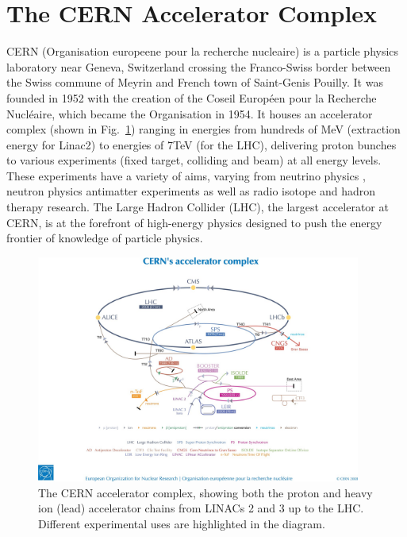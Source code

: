 \section{The CERN Accelerator Complex}

CERN (Organisation europeene pour la recherche nucleaire) is a particle physics laboratory near Geneva, Switzerland crossing the Franco-Swiss border between the Swiss commune of Meyrin and French town of Saint-Genis Pouilly. It was founded in 1952 with the creation of the Coseil Europ\'{e}en pour la Recherche Nucl\'{e}aire, which became the Organisation in 1954. It houses an accelerator complex (shown in Fig.~\ref{fig:CERN-acc-complex}) ranging in energies from hundreds of MeV (extraction energy for Linac2) to energies of 7TeV (for the LHC), delivering proton bunches to various experiments (fixed target, colliding and beam) at all energy levels. These experiments have a variety of aims, varying from neutrino physics \cite{Bailey:CNGS}, neutron physics \cite{ntof} antimatter experiments \cite{Gabrielse:ATRAP,Hori:ASACUSA,Hangst:ALPHA} as well as radio isotope \cite{Kadi:ISOLDE} and hadron therapy \cite{Maggiore:ACE} research. The Large Hadron Collider (LHC), the largest accelerator at CERN, is at the forefront of high-energy physics designed to push the energy frontier of knowledge of particle physics.

\begin{figure}
\begin{center}
\includegraphics[width=0.95\textwidth]{Introduction/figures/cernaccelerators.jpg}
\end{center}
\label{fig:CERN-acc-complex}
\caption{The CERN accelerator complex, showing both the proton and heavy ion (lead) accelerator chains from LINACs 2 and 3 up to the LHC. Different experimental uses are highlighted in the diagram.}
\end{figure}

